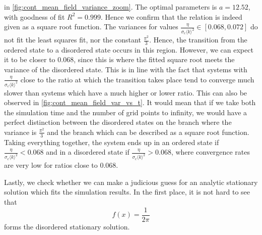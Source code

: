 in \cref{fig:cont_mean_field_variance_zoom}. The optimal parameters is $a = 12.52$, with goodness of fit $R^2 = 0.999$. Hence we confirm that the relation is indeed given as a square root function. The variances for values $\frac{\eta}{\sigma_c\langle k \rangle^2} \in [0.068, 0.072]$ do not fit the least squares fit, nor the constant $\frac{\pi^2}{3}$. Hence, the transition from the ordered state to a disordered state occurs in this region. However, we can expect it to be closer to $0.068$, since this is where the fitted square root meets the variance of the disordered state. This is in line with the fact that systems with $\frac{\eta}{\sigma_c\langle k \rangle^2}$ close to the ratio at which the transition takes place tend to converge much slower than systems which have a much higher or lower ratio. This can also be observed in \cref{fig:cont_mean_field_var_vs_t}. It would mean that if we take both the simulation time and the number of grid points to infinity, we would have a perfect distinction between the disordered states on the branch where the variance is $\frac{\pi^2}{3}$ and the branch which can be described as a square root function. Taking everything together, the system ends up in an ordered state if $\frac{\eta}{\sigma_c\langle k \rangle^2} < 0.068$ and in a disordered state if $\frac{\eta}{\sigma_c\langle k \rangle^2}>0.068$, where convergence rates are very low for ratios close to $0.068$. 

Lastly, we check whether we can make a judicious guess for an analytic stationary solution which fits the simulation results. In the first place, it is not hard to see that 
\begin{equation}
f(x)=\frac{1}{2\pi}
\end{equation}
forms the disordered stationary solution.

